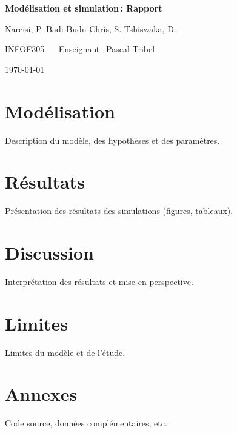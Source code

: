 \documentclass[12pt, a4paper]{article}
\begin{document}
\begin{center}
  {\sffamily\bfseries\LARGE Modélisation et simulation\,: Rapport\par}
  \vspace{1em}
  {\large Narcisi, P. \quad Badi Budu Chris, S. \quad Tshiswaka, D.\par}
  \vspace{0.3em}
  {\small INFOF305 --- Enseignant\,: Pascal Tribel \par}
  {\small \today\par}
\end{center}
\vspace{1em}

\section{Modélisation}\label{sec:modelisation}

Description du modèle, des hypothèses et des paramètres.

\section{Résultats}\label{sec:resultats}

Présentation des résultats des simulations (figures, tableaux).

\section{Discussion}\label{sec:discussion}

Interprétation des résultats et mise en perspective.

\section{Limites}\label{sec:limites}

Limites du modèle et de l'étude.

\nocite{*}  %
\printbibliography[heading=bibintoc, title={Bibliographie}]

\appendix
\section*{Annexes}

Code source, données complémentaires, etc.
\end{document}
